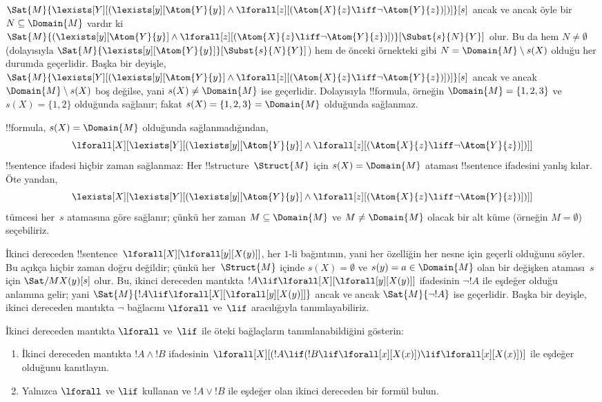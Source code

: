\documentclass[../../../include/open-logic-section]{subfiles}
\begin{document}
\begin{ex}
  $\Sat{M}{\lexists[Y][(\lexists[y][\Atom{Y}{y}] \land
  \lforall[z][(\Atom{X}{z} \liff \lnot \Atom{Y}{z})])]}[s]$ ancak ve
  ancak öyle bir $N \subseteq \Domain{M}$ vardır ki
  $\Sat{M}{(\lexists[y][\Atom{Y}{y}] \land \lforall[z][(\Atom{X}{z}
  \liff \lnot \Atom{Y}{z})])}[\Subst{s}{N}{Y}]$ olur. Bu da hem
  $N \neq \emptyset$ (dolayısıyla
  $\Sat{M}{\lexists[y][\Atom{Y}{y}]}[\Subst{s}{N}{Y}]$) hem de önceki
  örnekteki gibi $N = \Domain{M} \setminus s(X)$ olduğu her durumda
  geçerlidir. Başka bir deyişle,
  $\Sat{M}{\lexists[Y][(\lexists[y][\Atom{Y}{y}] \land
  \lforall[z][(\Atom{X}{z} \liff \lnot \Atom{Y}{z})])]}[s]$ ancak ve
  ancak $\Domain{M} \setminus s(X)$ boş değilse, yani
  $s(X) \neq \Domain{M}$ ise geçerlidir. Dolayısıyla !!{formula}, örneğin
  $\Domain{M} = \{1, 2, 3\}$ ve $s(X) = \{1, 2\}$ olduğunda sağlanır;
  fakat $s(X) = \{1, 2, 3\} = \Domain{M}$ olduğunda sağlanmaz.

  !!{formula}, $s(X) = \Domain{M}$ olduğunda sağlanmadığından,
  \[
  \lforall[X][\lexists[Y][(\lexists[y][\Atom{Y}{y}] \land
      \lforall[z][(\Atom{X}{z} \liff \lnot \Atom{Y}{z})])]]
  \]
  !!{sentence} ifadesi hiçbir zaman sağlanmaz: Her
  !!{structure}~$\Struct{M}$ için $s(X)=\Domain{M}$ ataması !!{sentence}
  ifadesini yanlış kılar. Öte yandan,
  \[
  \lexists[X][\lexists[Y][(\lexists[y][\Atom{Y}{y}] \land
      \lforall[z][(\Atom{X}{z} \liff \lnot \Atom{Y}{z})])]]
  \]
  tümcesi her~$s$ atamasına göre sağlanır; çünkü her zaman
  $M \subseteq \Domain{M}$ ve $M \neq \Domain{M}$ olacak bir alt küme
  (örneğin $M = \emptyset$) seçebiliriz.
\end{ex}

\begin{ex}
  İkinci dereceden
  !!{sentence}~$\lforall[X][\lforall[y][X(y)]]$, her $1$-li bağıntının,
  yani her özelliğin her nesne için geçerli olduğunu söyler. Bu açıkça
  hiçbir zaman doğru değildir; çünkü her~$\Struct{M}$ içinde
  $s(X)=\emptyset$ ve $s(y)=a\in\Domain{M}$ olan bir değişken ataması~$s$
  için $\Sat/{M}{X(y)}[s]$ olur. Bu, ikinci dereceden mantıkta
  $!A \lif \lforall[X][\lforall[y][X(y)]]$ ifadesinin $\lnot !A$ ile
  eşdeğer olduğu anlamına gelir; yani
  $\Sat{M}{!A \lif \lforall[X][\lforall[y][X(y)]]}$ ancak ve ancak
  $\Sat{M}{\lnot !A}$ ise geçerlidir. Başka bir deyişle, ikinci dereceden
  mantıkta $\lnot$ bağlacını $\lforall$ ve~$\lif$ aracılığıyla
  tanımlayabiliriz.
\end{ex}

\begin{prob}
  İkinci dereceden mantıkta $\lforall$ ve~$\lif$ ile öteki bağlaçların
  tanımlanabildiğini gösterin:
  \begin{enumerate}
    \item İkinci dereceden mantıkta $!A \land !B$ ifadesinin
    $\lforall[X][(!A \lif (!B \lif \lforall[x][X(x)])\lif
    \lforall[x][X(x)])]$ ile eşdeğer olduğunu kanıtlayın.
    \item Yalnızca $\lforall$ ve $\lif$ kullanan ve $!A \lor !B$ ile
    eşdeğer olan ikinci dereceden bir formül bulun.
  \end{enumerate}
\end{prob}
\end{document}
